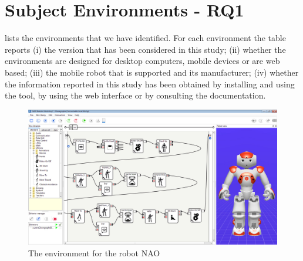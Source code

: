 \section{Subject Environments - RQ1}\label{sec:environments}

 lists the environments that we have identified.
For each environment the table reports  
(i) the version that has been considered in this study;
(ii) whether the environments are designed for desktop computers,
mobile devices or are web based;
(iii) the mobile robot that is supported and its manufacturer;
(iv) whether the information reported in this study has been obtained by installing and using the tool, by using the web interface or by consulting the documentation.
 





\begin{figure}[t]
     \centering
    \includegraphics[width=\columnwidth]{fig/examples/choregraphe.jpg}
      \caption{The environment \choregraphe for the robot NAO}
      \label{fig:choregraphe}
   \end{figure}

